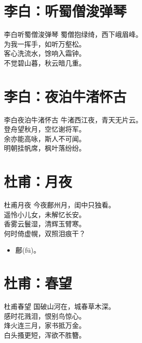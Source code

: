 \documentclass[12pt,oneside,a5paper]{book}
\begin{document}
\chapter{李白：听蜀僧浚弹琴}
\begin{poemzh}{李白}{听蜀僧浚弹琴}
蜀僧抱绿绮，西下峨眉峰。\\
为我一挥手，如听万壑松。\\
客心洗流水，馀响入霜钟。\\
不觉碧山暮，秋云暗几重。\\ 
\end{poemzh}

\chapter{李白：夜泊牛渚怀古}
\begin{poemzh}{李白}{夜泊牛渚怀古}
牛渚西江夜，青天无片云。\\
登舟望秋月，空忆谢将军。\\
余亦能高咏，斯人不可闻。\\
明朝挂帆席，枫叶落纷纷。\\ 
\end{poemzh}

\chapter{杜甫：月夜}
\begin{poemzh}{杜甫}{月夜}
今夜鄜州月，闺中只独看。\\
遥怜小儿女，未解忆长安。\\
香雾云鬟湿，清辉玉臂寒。\\
何时倚虚幌，双照泪痕干？\\ 
\end{poemzh}

\begin{itemize}
\item 鄜(fū)。
\end{itemize}

\chapter{杜甫：春望}
\begin{poemzh}{杜甫}{春望}
国破山河在，城春草木深。\\
感时花溅泪，恨别鸟惊心。\\
烽火连三月，家书抵万金。\\
白头搔更短，浑欲不胜簪。\\ 
\end{poemzh}
\end{document}
